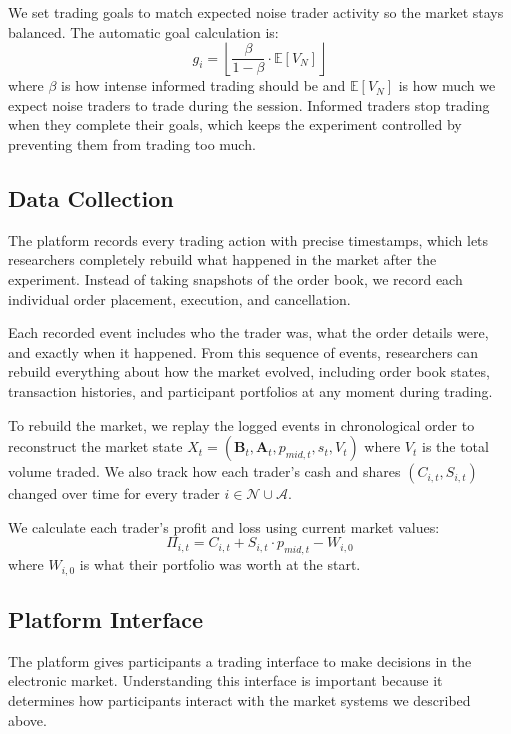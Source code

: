 We set trading goals to match expected noise trader activity so the market stays balanced. The automatic goal calculation is:
\begin{equation}
g_i = \left\lfloor \frac{\beta}{1-\beta} \cdot \mathbb{E}[V_N] \right\rfloor
\end{equation}
where $\beta$ is how intense informed trading should be and $\mathbb{E}[V_N]$ is how much we expect noise traders to trade during the session. Informed traders stop trading when they complete their goals, which keeps the experiment controlled by preventing them from trading too much.

\subsection{Data Collection}

The platform records every trading action with precise timestamps, which lets researchers completely rebuild what happened in the market after the experiment. Instead of taking snapshots of the order book, we record each individual order placement, execution, and cancellation.

Each recorded event includes who the trader was, what the order details were, and exactly when it happened. From this sequence of events, researchers can rebuild everything about how the market evolved, including order book states, transaction histories, and participant portfolios at any moment during trading.

To rebuild the market, we replay the logged events in chronological order to reconstruct the market state $X_t = (\mathbf{B}_t, \mathbf{A}_t, p_{mid,t}, s_t, V_t)$ where $V_t$ is the total volume traded. We also track how each trader's cash and shares $(C_{i,t}, S_{i,t})$ changed over time for every trader $i \in \mathcal{N} \cup \mathcal{A}$. 

We calculate each trader's profit and loss using current market values:
\begin{equation}
\Pi_{i,t} = C_{i,t} + S_{i,t} \cdot p_{mid,t} - W_{i,0} \label{eq:pnl}
\end{equation}
where $W_{i,0}$ is what their portfolio was worth at the start.

\subsection{Platform Interface}
\label{sec:interface}

The platform gives participants a trading interface to make decisions in the electronic market. Understanding this interface is important because it determines how participants interact with the market systems we described above.

